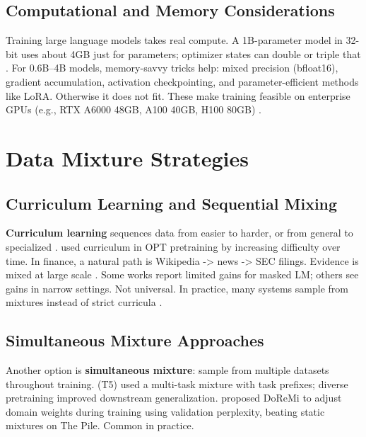 \subsection{Computational and Memory Considerations}

Training large language models takes real compute. A 1B-parameter model in 32-bit uses about 4GB just for parameters; optimizer states can double or triple that \parencite{rajbhandari2020zero,kingma2014adam}. For 0.6B--4B models, memory-savvy tricks help: mixed precision (bfloat16), gradient accumulation, activation checkpointing, and parameter-efficient methods like LoRA. Otherwise it does not fit. These make training feasible on enterprise GPUs (e.g., RTX A6000 48GB, A100 40GB, H100 80GB) \parencite{narayanan2021efficient,hu2021lora}.

\section{Data Mixture Strategies}

\subsection{Curriculum Learning and Sequential Mixing}

\textbf{Curriculum learning} sequences data from easier to harder, or from general to specialized \parencite{bengio2009curriculum}. \textcite{wu2022opt} used curriculum in OPT pretraining by increasing difficulty over time. In finance, a natural path is Wikipedia -> news -> SEC filings. Evidence is mixed at large scale \parencite{longpre2023pretrainer}. Some works report limited gains for masked LM; others see gains in narrow settings. Not universal. In practice, many systems sample from mixtures instead of strict curricula \parencite{raffel2020exploring,wu2022opt}.

\subsection{Simultaneous Mixture Approaches}

Another option is \textbf{simultaneous mixture}: sample from multiple datasets throughout training. \textcite{raffel2020exploring} (T5) used a multi-task mixture with task prefixes; diverse pretraining improved downstream generalization. \textcite{xie2023doremi} proposed DoReMi to adjust domain weights during training using validation perplexity, beating static mixtures on The Pile. Common in practice.

